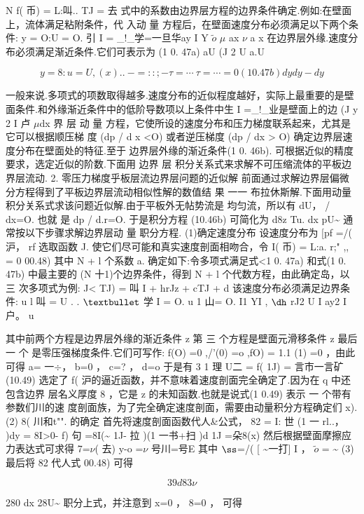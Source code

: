 N f( 币) = L:叫.. TJ = 去 式中的系数由边界层方程的边界条件确定.例如:在壁面上，流体满足粘附条件，代 入动 量 方程后，在壁面速度分布必须满足以下两个条件: y = O:U = O. 引 I = \_!\_学=一旦华ay I Y $\tilde{o}$ $\mu$ ax $\nu$ a x 在边界层外缘.速度分布必须满足渐近条件.它们可表示为 (1 0. 47a) aU (J 2 U a.U

\[y = 8:u = U , (x). .~- =::;-\tau = \cdots  ~\tau = \cdots = 0 (10. 47b) dy dy - dy\]

一般来说.多项式的项数取得越多.速度分布的近似程度越好，实际上最重要的是壁 面条件.和外缘渐近条件中的低阶导数项以上条件中生 I =\_!\_业是壁面上的边 (J y 2 I 卢 $\mu$dx 界 层 动 量 方程，它使所设的速度分布和压力梯度联系起来，尤其是它可以根据顺压梯 度 (dp / d x <O) 或者逆压梯度 (dp / dx > O) 确定边界层速度分布在壁面处的特征.至于 边界层外缘的渐近条件(1 0. 46b). 可根据近似的精度要求，选定近似的阶数.下面用 边界 层 积分关系式来求解不可压缩流体的平板边界层流动. 2. 零压力梯度乎板层流边界层问题的近似解 前面通过求解边界层偏微分方程得到了平板边界层流动相似性解的数值结 果 一一 布拉休斯解.下面用动量积分关系式求该问题近似解.由于平板外无帖势流是 均匀流，所以有 dU， / dx=O. 也就 是 dp / d.r=O. 于是积分方程 (10.46b) 可简化为 d8z Tu. dx pU\textasciitilde{} 通常按以下步骤求解边界层动 量 职分方程. (1)确定速度分布 设速度分布为 [pf =/( 沪， rf 选取函数 J. 使它们尽可能和真实速度剖面相吻合，令 I( 币) = L:a. r;" ,, = 0 00.48) 其中 N + l 个系数 a. 确定如下:令多项式满足式<1 0. 47a) 和式(1 0. 47b) 中最主要的 (N 十1)个边界条件，得到 N + l 个代数方程，由此确定岛，以 三 次多项式为例: J< TJ) = 叫 I + hrJz + cTJ + d 该速度分布必须满足边界条件: u l 叫 = U . . ${\rm •}$ 学 I = O. u 1 山= O. I1 YI , ${\rm ð}$ rJ2 U I ay2 I 户。 u

其中前两个方程是边界层外缘的渐近条件 z 第 三 个方程是壁面元滑移条件 z 最后 一 个 是零压强梯度条件.它们可写作: f(O) =0 ,/'(0) =o ,fO) = 1.1 (1) =0 ，由此可得 a= 一$\div$， b=0 ， c=? ， d=o 于是有 3 1 理 U二 = f( 1J) = 言市一言矿 (10.49) 选定了 f( 沪的逼近函数，并不意味着速度剖面完全确定了.因为在 q 中还包含边界 层名义厚度 8 ，它是 z 的未知函数.也就是说式(1 0.49) 表示 一 个带有参数们川的速 度剖面族，为了完全确定速度剖面，需要由动量积分方程确定们 x). (2) 8( 川和t"". 的确定 首先将速度剖面函数代人\&公式， 82 = I: 世 (1 一 rl..， )dy = 8I>0- f) 句 =8I(\textasciitilde{} 1J- 拉 )(1 一书+扫 )d 1J =朵8(x) 然后根据壁面摩擦应力表达式可求得 7=$\nu$( 去) y-o =$\nu$ 号川=号E 其中 ${\rm ß}$=/( [ \textasciitilde{}一打] I ， $\tilde{o}$ = \textasciitilde{} (3) 最后将 82 代人式 00.48) 可得

\[39 d8 3\nu \]

280 dx 28U\textasciitilde{} 职分上式，并注意到 x=0 ， 8=0 ， 可得

